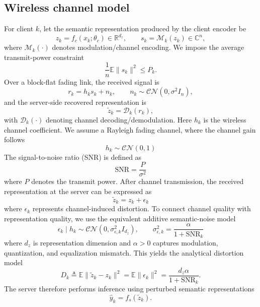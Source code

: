 \documentclass[10pt,journal]{IEEEtran}
\begin{document}
\subsection{Wireless channel model}
For client $k$, let the semantic representation produced by the client encoder be
\begin{equation}
z_k = f_c(x_k;\theta_c) \in \mathbb{R}^{d_z},\qquad
s_k = \mathcal{M}_k(z_k) \in \mathbb{C}^{n},
\end{equation}
where $\mathcal{M}_k(\cdot)$ denotes modulation/channel encoding. We impose the average transmit-power constraint
\begin{equation}
\frac{1}{n}\mathbb{E}\|s_k\|^2 \le P_k.
\end{equation}
Over a block-flat fading link, the received signal is
\begin{equation}
r_k = h_k s_k + n_k,
\qquad
n_k \sim \mathcal{CN}(0,\sigma^2 I_n),
\end{equation}
and the server-side recovered representation is
\begin{equation}
\tilde{z}_k = \mathcal{D}_k(r_k),
\end{equation}
with $\mathcal{D}_k(\cdot)$ denoting channel decoding/demodulation\cite{Goldsmith_2005,Tse_Viswanath_2005}. Here $h_k$ is the wireless channel coefficient.
We assume a Rayleigh fading channel, where the channel gain follows
\begin{equation}
h_k \sim \mathcal{CN}(0,1)
\end{equation}
The signal-to-noise ratio (SNR) is defined as
\begin{equation}
\text{SNR} = \frac{P}{\sigma^2}
\end{equation}
where $P$ denotes the transmit power.
After channel transmission, the received representation at the server can be expressed as
\begin{equation}
\tilde{z}_k = z_k + \epsilon_k
\end{equation}
where $\epsilon_k$ represents channel-induced distortion.
To connect channel quality with representation quality, we use the equivalent additive semantic-noise model
\begin{equation}
\epsilon_k \mid h_k \sim \mathcal{CN}(0,\sigma_{\epsilon,k}^2 I_{d_z}),
\qquad
\sigma_{\epsilon,k}^2 = \frac{\alpha}{1+\mathrm{SNR}_k}
\end{equation}
where $d_z$ is representation dimension and $\alpha>0$ captures modulation, quantization, and equalization mismatch. This yields the analytical distortion model
\begin{equation}
D_k \triangleq \mathbb{E}\|\tilde{z}_k-z_k\|^2=\mathbb{E}\|\epsilon_k\|^2=\frac{d_z\alpha}{1+\mathrm{SNR}_k}.
\end{equation}
The server therefore performs inference using perturbed semantic representations
\begin{equation}
\hat{y}_k = f_s(\tilde{z}_k).
\end{equation}
\end{document}
